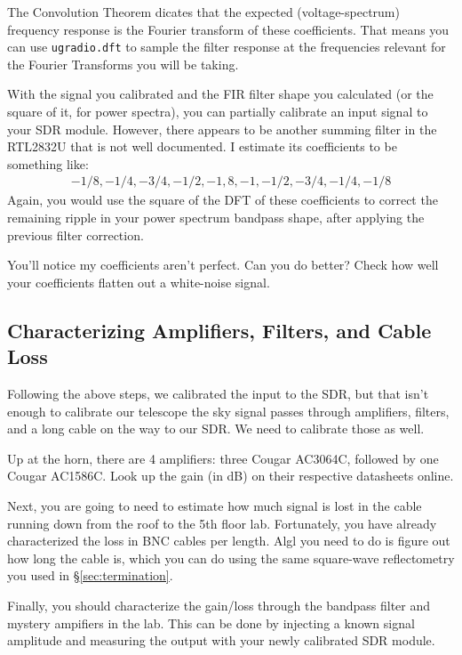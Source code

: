 \documentclass[11pt,preprint]{aastex}
\begin{document}
The Convolution Theorem dicates that the expected (voltage-spectrum)
frequency response is the Fourier transform of these coefficients.
That means you can use {\tt ugradio.dft} to sample the 
filter response at the frequencies
relevant for the Fourier Transforms you will be taking.

With the signal you calibrated and the FIR filter shape you calculated
(or the square of it, for power spectra), you can
partially calibrate an input signal to your SDR module. However, there
appears to be another summing filter in the RTL2832U that is not
well documented. I estimate its coefficients to be something like:
$$
\begin{aligned}
-1/8, -1/4, -3/4, -1/2, -1, 8, -1, -1/2, -3/4, -1/4, -1/8
\end{aligned}
$$
Again, you would use the square of the DFT of these coefficients to correct
the remaining ripple in your power spectrum bandpass shape, after applying
the previous filter correction.

You'll notice my coefficients aren't perfect. Can you do better? Check how
well your coefficients flatten out a white-noise signal.

\subsection{Characterizing Amplifiers, Filters, and Cable Loss}

Following the above steps, we calibrated the input to the SDR, but
that isn't enough to calibrate our telescope the sky signal passes through
amplifiers, filters, and a long cable on the way to our SDR. We need
to calibrate those as well.

Up at the horn, there are 4 amplifiers: three Cougar AC3064C, followed by
one Cougar AC1586C. Look up the gain (in dB) on their respective datasheets
online.

Next, you are going to need to estimate how much signal is lost in the
cable running down from the roof to the 5th floor lab. Fortunately, you
have already characterized the loss in BNC cables per length. Algl you need
to do is figure out how long the cable is, which you can do using the
same square-wave reflectometry you used in \S\ref{sec:termination}.

Finally, you should characterize the gain/loss through the bandpass
filter and mystery ampifiers in the lab. This can be done by injecting a
known signal amplitude and measuring the output with your newly calibrated
SDR module.
\end{document}
